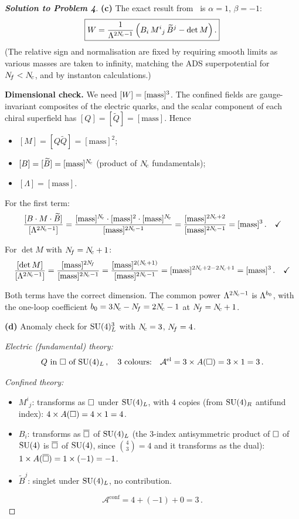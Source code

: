 \documentclass[11pt,a4paper]{article}
\begin{document}
\begin{proof}[\textbf{Solution to Problem 4}]
\textbf{(c)} The exact result from~\cite{Seiberg1995,IS1995} is
$\alpha = 1$, $\beta = -1$:
\[
  \boxed{
    W = \frac{1}{\Lambda^{2N_{\!c} - 1}}
    \left(B_i\, M^i{}_j\, \widetilde{B}^j - \det M\right).
  }
\]
(The relative sign and normalisation are fixed by requiring smooth
limits as various masses are taken to infinity, matching the ADS
superpotential for $N_{\!f} < N_{\!c}$, and by instanton calculations.)

\textbf{Dimensional check.}  We need
$[W] = [\mathrm{mass}]^3$.  The confined fields are gauge-invariant
composites of the electric quarks, and the scalar component of each
chiral superfield has $[Q] = [\widetilde{Q}] = [\mathrm{mass}]$.  Hence
\begin{itemize}
  \item $[M] = [Q\widetilde{Q}] = [\mathrm{mass}]^2$;
  \item $[B] = [\widetilde{B}] = [\mathrm{mass}]^{N_{\!c}}$ (product of
    $N_{\!c}$ fundamentals);
  \item $[\Lambda] = [\mathrm{mass}]$.
\end{itemize}

For the first term:
\[
  \frac{[B \cdot M \cdot \widetilde{B}]}{[\Lambda^{2N_{\!c}-1}]}
  = \frac{[\mathrm{mass}]^{N_{\!c}} \cdot [\mathrm{mass}]^2
  \cdot [\mathrm{mass}]^{N_{\!c}}}{[\mathrm{mass}]^{2N_{\!c} - 1}}
  = \frac{[\mathrm{mass}]^{2N_{\!c} + 2}}{[\mathrm{mass}]^{2N_{\!c} - 1}}
  = [\mathrm{mass}]^3\,.
  \quad\checkmark
\]

For $\det M$ with $N_{\!f} = N_{\!c} + 1$:
\[
  \frac{[\det M]}{[\Lambda^{2N_{\!c}-1}]}
  = \frac{[\mathrm{mass}]^{2N_{\!f}}}{[\mathrm{mass}]^{2N_{\!c}-1}}
  = \frac{[\mathrm{mass}]^{2(N_{\!c}+1)}}{[\mathrm{mass}]^{2N_{\!c}-1}}
  = [\mathrm{mass}]^{2N_{\!c} + 2 - 2N_{\!c} + 1}
  = [\mathrm{mass}]^3\,.
  \quad\checkmark
\]

Both terms have the correct dimension.  The common power
$\Lambda^{2N_{\!c} - 1}$ is $\Lambda^{b_0}$, with the one-loop coefficient
$b_0 = 3N_{\!c} - N_{\!f} = 2N_{\!c} - 1$ at $N_{\!f} = N_{\!c} + 1$.

\bigskip

\textbf{(d)} Anomaly check for $\mathrm{SU}(4)_L^3$ with $N_{\!c} = 3$,
$N_{\!f} = 4$.

\textit{Electric (fundamental) theory:}
\[
  Q \text{ in } \square \text{ of } \mathrm{SU}(4)_L\,,\quad 3 \text{ colours:}\quad
  \mathcal{A}^{\mathrm{el}} = 3 \times A(\square) = 3 \times 1 = 3\,.
\]

\textit{Confined theory:}
\begin{itemize}
  \item $M^i{}_j$: transforms as $\square$ under $\mathrm{SU}(4)_L$, with $4$
    copies (from $\mathrm{SU}(4)_R$ antifund index):
    $4 \times A(\square) = 4 \times 1 = 4$.
  \item $B_i$: transforms as $\overline{\square}$ of $\mathrm{SU}(4)_L$ (the $3$-index
    antisymmetric product of $\square$ of $\mathrm{SU}(4)$ is $\overline{\square}$ of
    $\mathrm{SU}(4)$, since $\binom{4}{3} = 4$ and it transforms as the dual):
    $1 \times A(\overline{\square}) = 1 \times (-1) = -1$.
  \item $\widetilde{B}^j$: singlet under $\mathrm{SU}(4)_L$, no contribution.
\end{itemize}
\[
  \mathcal{A}^{\mathrm{conf}} = 4 + (-1) + 0 = 3\,.
\]


\end{proof}
\end{document}
